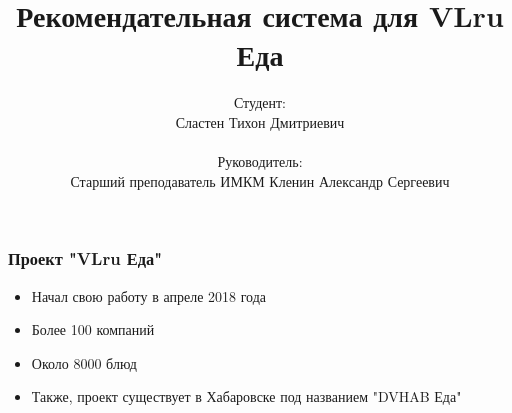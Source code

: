 \documentclass{beamer}
\title{Рекомендательная система для VLru Еда}
\author{
    Студент: \\ Сластен Тихон Дмитриевич \\ \\
    Руководитель: \\ Старший преподаватель ИМКМ Кленин Александр Сергеевич}
\institute{Б8403а Прикладная математика и информатика}
\date{}
\begin{document}
\maketitle

\begin{frame}
  \frametitle{Проект "VLru Еда"}
  \begin{itemize}
    \item Начал свою работу в апреле 2018 года
    \item Более 100 компаний
    \item Около 8000 блюд
    \item Также, проект существует в Хабаровске под названием "DVHAB Еда"
  \end{itemize}
\end{frame}
\end{document}
